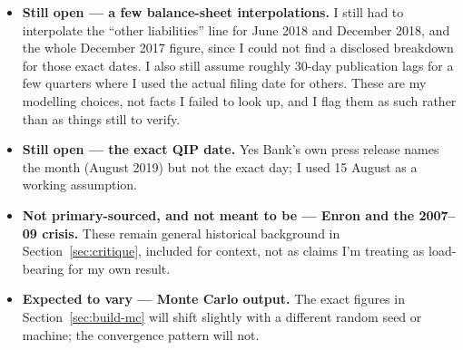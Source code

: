 \begin{itemize}
\item \textbf{Still open --- a few balance-sheet interpolations.} I still had to interpolate the ``other liabilities'' line for June 2018 and December 2018, and the whole December 2017 figure, since I could not find a disclosed breakdown for those exact dates. I also still assume roughly 30-day publication lags for a few quarters where I used the actual filing date for others. These are my modelling choices, not facts I failed to look up, and I flag them as such rather than as things still to verify.
\item \textbf{Still open --- the exact QIP date.} Yes Bank's own press release names the month (August 2019) but not the exact day; I used 15 August as a working assumption.
\item \textbf{Not primary-sourced, and not meant to be --- Enron and the 2007--09 crisis.} These remain general historical background in Section~\ref{sec:critique}, included for context, not as claims I'm treating as load-bearing for my own result.
\item \textbf{Expected to vary --- Monte Carlo output.} The exact figures in Section~\ref{sec:build-mc} will shift slightly with a different random seed or machine; the convergence pattern will not.
\end{itemize}

\appendix
